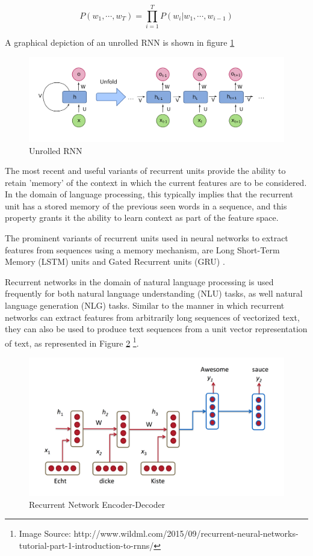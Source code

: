 \begin{equation}
	P(w_1, \cdots, w_T) = \prod_{i=1}^T P(w_i | w_1, \cdots, w_{i−1})
\end{equation}

A graphical depiction of an unrolled RNN is shown in figure \ref{fig:recurrent-neural-network-unfold}

\begin{figure}[ht]
	\centering
	\includegraphics[width=.8\textwidth]{images/recurrent-neural-network-unfold}
	\caption{\label{fig:recurrent-neural-network-unfold} Unrolled RNN}
\end{figure}

The most recent and useful variants of recurrent units provide the ability to retain 'memory' of the context in which the current features are to be considered. In the domain of language processing, this typically implies that the recurrent unit has a stored memory of the previous seen words in a sequence, and this property grants it the ability to learn context as part of the feature space.

The prominent variants of recurrent units used in neural networks to extract features from sequences using a memory mechanism, are Long Short-Term Memory (LSTM) units \citep{gers2001lstm} and Gated Recurrent units (GRU) \citep{chung2014empirical}.

Recurrent networks in the domain of natural language processing is used frequently for both natural language understanding (NLU) tasks, as well natural language generation (NLG) tasks. Similar to the manner in which recurrent networks can extract features from arbitrarily long sequences of vectorized text, they can also be used to produce text sequences from a unit vector representation of text, as represented in Figure \ref{fig:rnn-nmt} \footnote{Image Source: http://www.wildml.com/2015/09/recurrent-neural-networks-tutorial-part-1-introduction-to-rnns/}.

\begin{figure}[ht]
	\centering
	\includegraphics[width=.8\textwidth]{images/rnn-nmt}
	\caption{\label{fig:rnn-nmt} Recurrent Network Encoder-Decoder}
\end{figure}


